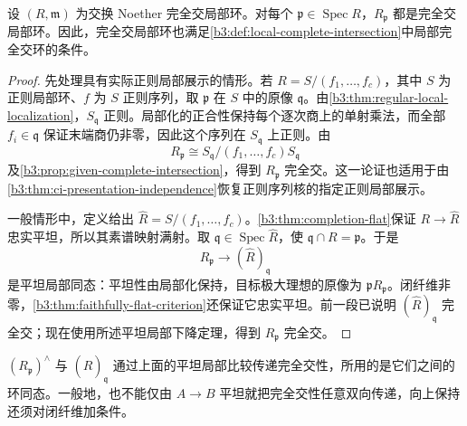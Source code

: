 \begin{proposition}\label{b3:prop:ci-localization}
	设 \((R,\mathfrak m)\) 为交换 Noether 完全交局部环。对每个 \(\mathfrak p\in\operatorname{Spec}R\)，\(R_{\mathfrak p}\) 都是完全交局部环。因此，完全交局部环也满足\cref{b3:def:local-complete-intersection}中局部完全交环的条件。
\end{proposition}
\begin{proof}
	先处理具有实际正则局部展示的情形。若 \(R=S/(f_1,\ldots,f_c)\)，其中 \(S\) 为正则局部环、\(f\) 为 \(S\) 正则序列，取 \(\mathfrak p\) 在 \(S\) 中的原像 \(\mathfrak q\)。由\cref{b3:thm:regular-local-localization}，\(S_{\mathfrak q}\) 正则。局部化的正合性保持每个逐次商上的单射乘法，而全部 \(f_i\in\mathfrak q\) 保证末端商仍非零，因此这个序列在 \(S_{\mathfrak q}\) 上正则。由
	\[
		R_{\mathfrak p}\cong S_{\mathfrak q}/(f_1,\ldots,f_c)S_{\mathfrak q}
	\]
	及\cref{b3:prop:given-complete-intersection}，得到 \(R_{\mathfrak p}\) 完全交。这一论证也适用于由\cref{b3:thm:ci-presentation-independence}恢复正则序列核的指定正则局部展示。

	一般情形中，定义给出 \(\widehat R=S/(f_1,\ldots,f_c)\)。\cref{b3:thm:completion-flat}保证 \(R\to\widehat R\) 忠实平坦，所以其素谱映射满射。取 \(\mathfrak q\in\operatorname{Spec}\widehat R\)，使 \(\mathfrak q\cap R=\mathfrak p\)。于是
	\[
		R_{\mathfrak p}\longrightarrow (\widehat R)_{\mathfrak q}
	\]
	是平坦局部同态：平坦性由局部化保持，目标极大理想的原像为 \(\mathfrak pR_{\mathfrak p}\)。闭纤维非零，\cref{b3:thm:faithfully-flat-criterion}还保证它忠实平坦。前一段已说明 \((\widehat R)_{\mathfrak q}\) 完全交；现在使用所述平坦局部下降定理，得到 \(R_{\mathfrak p}\) 完全交。
\end{proof}

\((R_{\mathfrak p})^{\wedge}\) 与 \((\widehat R)_{\mathfrak q}\) 通过上面的平坦局部比较传递完全交性，所用的是它们之间的环同态。一般地，也不能仅由 \(A\to B\) 平坦就把完全交性任意双向传递，向上保持还须对闭纤维加条件。
